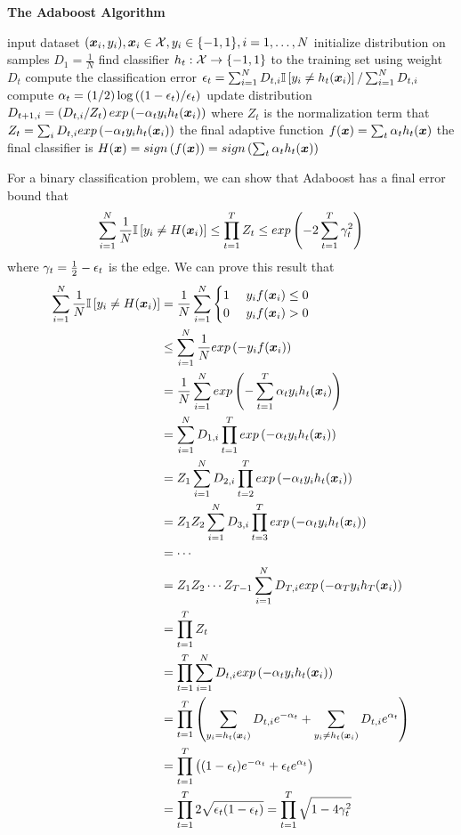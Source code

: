 \begin{algorithm}[H]
	\caption*{\bf The Adaboost Algorithm}
	\begin{algorithmic}
		\State input dataset $(\boldsymbol{x}_i,y_i),\boldsymbol{x}_i\in\mathcal{X},y_i\in\{-1,1\},i=1,\dotsc,N$
		\State initialize distribution on samples $D_1=\frac{1}{N}$
		\State find classifier $h_t:\mathcal{X}\to\{-1,1\}$ to the training set using weight $D_t$
		\State compute the classification error $\epsilon_t=\sum_{i=1}^ND_{t,i}\mathbb{I}\left[y_i\neq h_t(\boldsymbol{x}_i)\right]/\sum_{i=1}^ND_{t,i}$
		\State compute $\alpha_t=\left(1/2\right)\log\left((1-\epsilon_t)/\epsilon_t\right)$
		\State update distribution $D_{t+1,i}=\left(D_{t,i}/Z_t\right)exp\left(-\alpha_ty_ih_t(\boldsymbol{x}_i)\right)$ where $Z_t$ is the normalization term that $Z_t=\sum_iD_{t,i}exp\left(-\alpha_ty_ih_t(\boldsymbol{x}_i)\right)$
		\EndFor
		\State the final adaptive function $f(\boldsymbol{x})=\sum_t\alpha_th_t(\boldsymbol{x})$
		\State the final classifier is $H(\boldsymbol{x})=sign\left(f(\boldsymbol{x})\right)=sign\left(\sum_t\alpha_th_t(\boldsymbol{x})\right)$
	\end{algorithmic}
\end{algorithm}
For a binary classification problem, we can show that Adaboost has a final error bound that
\begin{align*}
	\sum_{i=1}^N\frac{1}{N}\mathbb{I}\left[y_i\neq H(\boldsymbol{x}_i)\right]\leq\prod_{t=1}^TZ_t\leq exp\left(-2\sum_{t=1}^T\gamma_t^2\right)
\end{align*}
where $\gamma_t=\frac{1}{2}-\epsilon_t$ is the edge. We can prove this result that
\begin{align*}
	\sum_{i=1}^N\frac{1}{N}\bI\left[y_i\neq H(\vec{x}_i)\right]&=\frac{1}{N}\sum_{i=1}^N\casefill{1\ &y_if(\vec{x}_i)\leq 0\\0\ &y_if(\vec{x}_i)>0} \\
	&\leq\sum_{i=1}^N\frac{1}{N}\e{-y_if(\vec{x}_i)} \\
	&=\frac{1}{N}\sum_{i=1}^N\e{-\sum_{t=1}^T\al_ty_ih_t(\vec{x}_i)} \\
	&=\sum_{i=1}^ND_{1,i}\prod_{t=1}^T\e{-\al_ty_ih_t(\vec{x}_i)} \\
	&=Z_1\sum_{i=1}^ND_{2,i}\prod_{t=2}^T\e{-\al_ty_ih_t(\vec{x}_i)} \\
	&=Z_1Z_2\sum_{i=1}^ND_{3,i}\prod_{t=3}^T\e{-\al_ty_ih_t(\vec{x}_i)} \\
	&=\cdots \\
	&=Z_1Z_2\cdots Z_{T-1}\sum_{i=1}^ND_{T,i}\e{-\al_Ty_ih_T(\vec{x}_i)} \\
	&=\prod_{t=1}^TZ_t \\
	&=\prod_{t=1}^T\sum_{i=1}^ND_{t,i}\e{-\al_ty_ih_t(\vec{x}_i)} \\
	&=\prod_{t=1}^T\left(\sum_{y_i=h_t(\vec{x}_i)}D_{t,i}e^{-\al_t}+\sum_{y_i\neq h_t(\vec{x}_i)}D_{t,i}e^{\al_t}\right) \\
	&=\prod_{t=1}^T\left((1-\ep_t)e^{-\al_t}+\ep_te^{\al_t}\right) \\
	&=\prod_{t=1}^T2\sqrt{\ep_t(1-\ep_t)}=\prod_{t=1}^T\sqrt{1-4\ga_t^2}
\end{align*}
